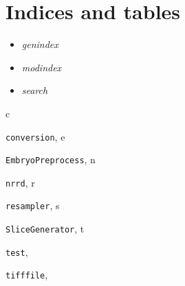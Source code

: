 \documentclass[letterpaper,10pt,english]{sphinxmanual}
\begin{document}
\chapter{Indices and tables}
\label{index:indices-and-tables}\begin{itemize}
\item {} 
\emph{genindex}

\item {} 
\emph{modindex}

\item {} 
\emph{search}

\end{itemize}


\renewcommand{\indexname}{Python Module Index}
\begin{theindex}
\def\bigletter#1{{\Large\sffamily#1}\nopagebreak\vspace{1mm}}
\bigletter{c}
\item {\texttt{conversion}}, \pageref{conversion:module-conversion}
\indexspace
\bigletter{e}
\item {\texttt{EmbryoPreprocess}}, \pageref{EmbryoPreprocess:module-EmbryoPreprocess}
\indexspace
\bigletter{n}
\item {\texttt{nrrd}}, \pageref{nrrd:module-nrrd}
\indexspace
\bigletter{r}
\item {\texttt{resampler}}, \pageref{resampler:module-resampler}
\indexspace
\bigletter{s}
\item {\texttt{SliceGenerator}}, \pageref{SliceGenerator:module-SliceGenerator}
\indexspace
\bigletter{t}
\item {\texttt{test}}, \pageref{test:module-test}
\item {\texttt{tifffile}}, \pageref{tifffile:module-tifffile}
\end{theindex}

\renewcommand{\indexname}{Index}
\printindex
\end{document}
